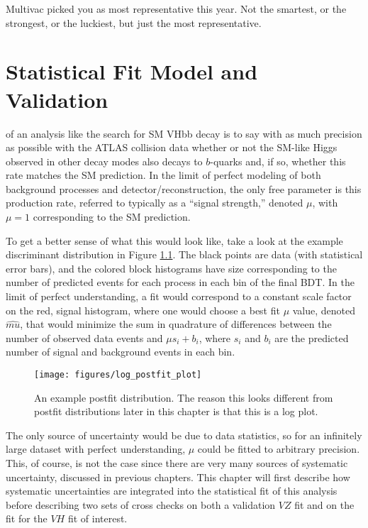 \begin{savequote}[75mm]
Multivac picked you as most representative this year.  Not the smartest, or the strongest, or the luckiest, but just the most representative.
\end{savequote}

\chapter{Statistical Fit Model and Validation}
\label{ch:fit}
 of an analysis like the search for SM VHbb decay is to say with as much precision as possible with the ATLAS collision data whether or not the SM-like Higgs observed in other decay modes also decays to $b$-quarks and, if so, whether this rate matches the SM prediction.  In the limit of perfect modeling of both background processes and detector/reconstruction, the only free parameter is this production rate, referred to typically as a ``signal strength,'' denoted $\mu$, with $\mu=1$ corresponding to the SM prediction.  

To get a better sense of what this would look like, take a look at the example discriminant distribution in Figure \ref{fig:postfiteg}.  The black points are data (with statistical error bars), and the colored block histograms have size corresponding to the number of predicted events for each process in each bin of the final BDT.  In the limit of perfect understanding, a fit would correspond to a constant scale factor on the red, signal histogram, where one would choose a best fit $\mu$ value, denoted $\hat{mu}$, that would minimize the sum in quadrature of differences between the number of observed data events and $\mu s_i+b_i$, where $s_i$ and $b_i$ are the predicted number of signal and background events in each bin.
\begin{figure}[!htbp]\captionsetup{justification=centering}
  \centering
  \texttt{[image: figures/log\_postfit\_plot]}
  \caption{An example postfit distribution.  The reason this looks different from postfit distributions later in this chapter is that this is a log plot.}
  \label{fig:postfiteg}
\end{figure}
The only source of uncertainty would be due to data statistics, so for an infinitely large dataset with perfect understanding, $\mu$ could be fitted to arbitrary precision.  This, of course, is not the case since there are very many sources of systematic uncertainty, discussed in previous chapters.  This chapter will first describe how systematic uncertainties are integrated into the statistical fit of this analysis before describing two sets of cross checks on both a validation $VZ$ fit and on the fit for the $VH$ fit of interest.

